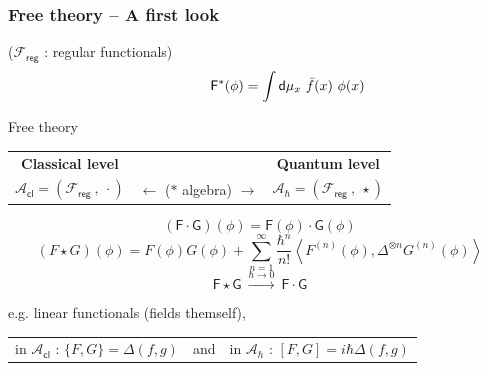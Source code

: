 \documentclass[9pt]{beamer}
\newcommand{\Smearip}[1]{\left\langle #1 \right\rangle} %
\newcommand{\Acal}{\mathcal{A}}
\newcommand{\Fcal}{\mathcal{F}}
\newcommand{\Fsf}{\mathsf{F}}
\newcommand{\Gsf}{\mathsf{G}}
\newcommand{\dsf}{\mathsf{d}}
\begin{document}
\begin{frame}

\frametitle{Free theory -- A first look}
  
\vfill  
  
($\Fcal_\mathsf{reg}$ : regular functionals)
\vspace*{-27.5pt}
\begin{equation*}
\hspace*{40pt} \Fsf^\ast(\phi) = \int \dsf\mu_x \ \bar{f}(x) \ \phi(x) 
\end{equation*}

 
\vspace*{-8pt}

\begin{block}{\center \vspace*{-14pt} Free theory}
\vspace*{-6pt}
\begin{center}
% 
\begin{tabular}{ccc}
%
\textbf{Classical level} & & \textbf{Quantum level} \\
%
$\Acal_\mathsf{cl} = \left( \Fcal_{\mathsf{reg}} \ , \ \cdot \right)$ & $\leftarrow$ ($\ast$ algebra) $\rightarrow$ & $\Acal_\hbar = \left( \Fcal_{\mathsf{reg}} \ , \ \star \right)$ 
%
\end{tabular}
%
\begin{equation*}
(\Fsf \cdot \Gsf)(\phi) = \Fsf(\phi) \cdot \Gsf(\phi) 
\end{equation*}
%
\begin{equation*}
(F \star G)(\phi) = F(\phi) G(\phi) + \sum_{n=1}^\infty \frac{\hbar^n}{n!} \Smearip{F^{(n)}(\phi), \Delta^{\otimes n} G^{(n)}(\phi)} 
\end{equation*}
%
\begin{equation*}
\Fsf \star \Gsf \ \overset{\hbar \to 0}{\longrightarrow} \ \Fsf \cdot \Gsf
\end{equation*}
%
\end{center}
%
\end{block}

\vfill

e.g. linear functionals (fields themself), 
\begin{tabular}{lcl}
in $\Acal_\mathsf{cl}$ : $\{F,G\} = \Delta(f,g)$ & and & in $\Acal_\hbar$ : $[F,G] = i \hbar \Delta(f,g)$ 
\end{tabular}

\vfill

\end{frame}  
\end{document}
